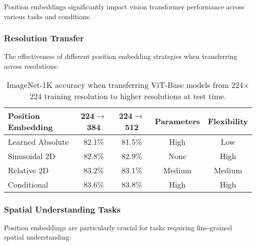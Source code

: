 Position embeddings significantly impact vision transformer performance across various tasks and conditions.

\subsubsection{Resolution Transfer}

The effectiveness of different position embedding strategies when transferring across resolutions:

\begin{table}[htbp]
\centering
\begin{tabular}{lcccc}
\toprule
\textbf{Position Embedding} & \textbf{224$\rightarrow$384} & \textbf{224$\rightarrow$512} & \textbf{Parameters} & \textbf{Flexibility} \\
\midrule
Learned Absolute & 82.1\% & 81.5\% & High & Low \\
Sinusoidal 2D & 82.8\% & 82.9\% & None & High \\
Relative 2D & 83.2\% & 83.1\% & Medium & Medium \\
Conditional & 83.6\% & 83.8\% & High & High \\
\bottomrule
\end{tabular}
\caption{ImageNet-1K accuracy when transferring ViT-Base models from 224$\times$224 training resolution to higher resolutions at test time.}
\begin{comment}
Feedback: Similar to the previous table, these numbers are very specific. It's better to cite the source or make it clear these are illustrative. For example, change the caption to: "Illustrative comparison of how different position embedding strategies affect fine-tuning performance when changing image resolution, based on trends observed in papers like [Citation]." This avoids presenting specific numbers as universal truths.
\end{comment}
\end{table}

\subsubsection{Spatial Understanding Tasks}

Position embeddings are particularly crucial for tasks requiring fine-grained spatial understanding:

